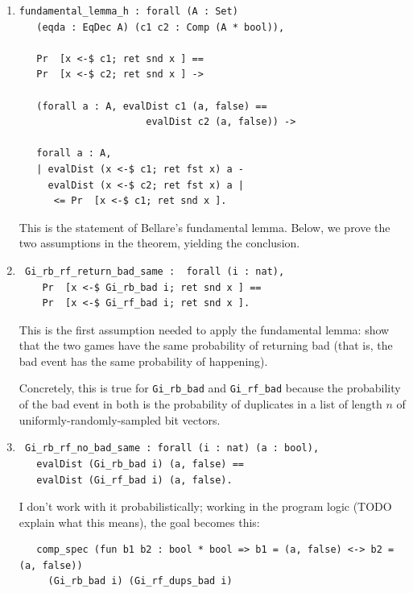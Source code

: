 \documentclass[12pt,lot, lof]{puthesis}
\newcommand{\li} {\lstinline}
\begin{document}
{\begin{enumerate}
\par
\item \begin{lstlisting}
fundamental_lemma_h : forall (A : Set) 
   (eqda : EqDec A) (c1 c2 : Comp (A * bool)),
   
   Pr  [x <-$ c1; ret snd x ] == 
   Pr  [x <-$ c2; ret snd x ] ->
   
   (forall a : A, evalDist c1 (a, false) == 
                      evalDist c2 (a, false)) ->
                      
   forall a : A,
   | evalDist (x <-$ c1; ret fst x) a - 
     evalDist (x <-$ c2; ret fst x) a |
      <= Pr  [x <-$ c1; ret snd x ].
\end{lstlisting}

This is the statement of Bellare's fundamental lemma. Below, we prove the two assumptions in the theorem, yielding the conclusion.

\par
\item \begin{lstlisting}
 Gi_rb_rf_return_bad_same :  forall (i : nat),
    Pr  [x <-$ Gi_rb_bad i; ret snd x ] ==
    Pr  [x <-$ Gi_rf_bad i; ret snd x ].
\end{lstlisting}

This is the first assumption needed to apply the fundamental lemma: show that the two games have the same probability of returning bad (that is, the bad event has the same probability of happening).

Concretely, this is true for \li|Gi_rb_bad| and \li|Gi_rf_bad| because the probability of the bad event in both is the probability of duplicates in a list of length $n$ of uniformly-randomly-sampled bit vectors.

\par
\item \begin{lstlisting}
 Gi_rb_rf_no_bad_same : forall (i : nat) (a : bool),
   evalDist (Gi_rb_bad i) (a, false) == 
   evalDist (Gi_rf_bad i) (a, false).
\end{lstlisting}

I don't work with it probabilistically; working in the program logic (TODO explain what this means), the goal becomes this:

\begin{lstlisting}
   comp_spec (fun b1 b2 : bool * bool => b1 = (a, false) <-> b2 = (a, false))
     (Gi_rb_bad i) (Gi_rf_dups_bad i)
\end{lstlisting}     


\end{enumerate}}
\end{document}
